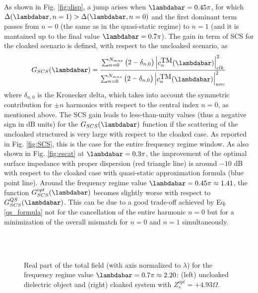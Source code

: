 \documentclass[reprint, showpacs, amsmath,amssymb, aps,
prb]{revtex4-1}
\begin{document}
As shown in Fig. \ref{fig:disp}, a jump arises when $\lambdabar=0.45\pi$, for which $\Delta(\lambdabar,n=1) >\Delta(\lambdabar,n=0)$ and the first dominant term passes from $n=0$ (the same as in the quasi-static regime) to $n=1$ (and it is mantained up to the final value $\lambdabar=0.7\pi$). The gain in term of SCS for the cloaked scenario is defined, with respect to the uncloaked scenario, as
%
\begin{align}
G_{SCS}(\lambdabar)=\dfrac{\sum_{n=0}^{N_{max}} \begin{pmatrix} 2- \delta_{n,0}\end{pmatrix} \begin{vmatrix}c_n^{\mbox{TM}}(\lambdabar)\end{vmatrix}^2_{clk} }{ \sum_{n=0}^{N_{max}} \begin{pmatrix}2- \delta_{n,0}\end{pmatrix} \begin{vmatrix}c_n^{\mbox{TM}}(\lambdabar)\end{vmatrix}^2_{unc} }
\label{eq:g_scs}
\end{align}
%
where $\delta_{n,0}$ is the Kronecker delta, which takes into account the symmetric contribution for $\pm n$ harmonics with respect to the central index $n=0$, as mentioned above.
The SCS gain leads to less-than-unity values (thus a negative sign in dB units) for the $G_{SCS}(\lambdabar)$ function if the scattering of the uncloaked structured is very large with respect to the cloaked case.
As reported in Fig. \ref{fig:SCS}, this is the case for the entire frequency regime window. As also shown in Fig. \ref{fig:escat} at $\lambdabar=0.3\pi$, the improvement of the optimal surface impedance with proper dispersion (red triangle line) is around $-10$ dB with respect to the cloaked case with quasi-static approximation formula (blue point line). Around the frequency regime value $\lambdabar=0.45 \pi \approx 1.41$, the function $G_{SCS}^{opt}(\lambdabar)$ becomes slightly worse with respect to $G_{SCS}^{QS}(\lambdabar)$. This can be due to a good trade-off achieved by Eq. \eqref{qs_formula} not for the cancellation of the entire harmonic $n=0$ but for a minimization of the overall mismatch for $n=0$ and $n=1$ simultaneously. 
%
\begin{figure}[ht!]
\vspace{5mm}
\centering
{}\\
\\
\caption{\small Real part of the total field (with axis normalized to $\lambda$) for the frequency regime value $\lambdabar=0.7\pi\approx 2.20$:  (left) uncloaked dielectric object and (right) cloaked system with $Z_s^{opt}=+4.93 \Omega$.}
\label{fig:etot}
\end{figure}
\end{document}
